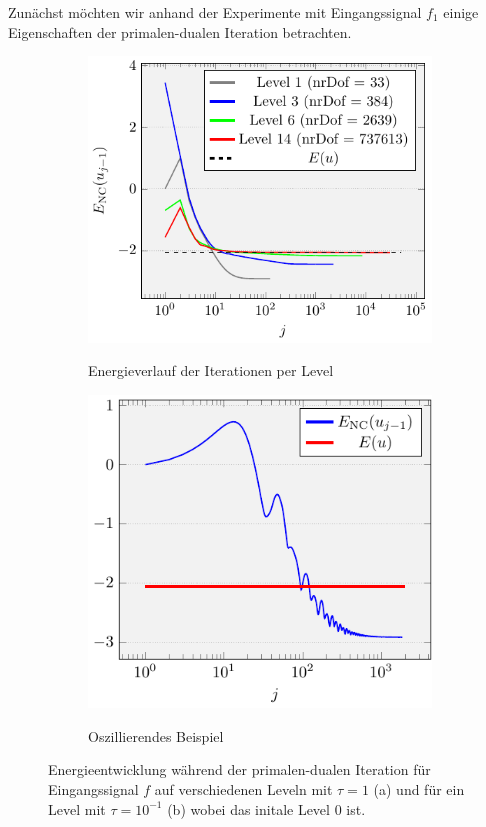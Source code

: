 Zunächst möchten wir anhand der Experimente mit Eingangssignal $f_1$ einige
Eigenschaften der primalen-dualen Iteration betrachten.
\begin{figure}[p]
  \centering
  \begin{subfigure}[b]{.5\linewidth}
    \centering
    \caption{Energieverlauf der Iterationen per Level}
    \includegraphics[width=\linewidth]
      {pictures/chapExperiments/secExactSol/iteration/lvlWise/convEnergy.pdf}
    \label{fig:iterationEnergyLevel}
  \end{subfigure}
  \quad
  \begin{subfigure}[b]{.46\linewidth}
    \centering
    \caption{Oszillierendes Beispiel}
    \includegraphics[width=\linewidth]
      {pictures/chapExperiments/secExactSol/iteration/osc/convEnergy.pdf}
    \label{fig:iterationEnergyOscillations}
  \end{subfigure}
  \caption{Energieentwicklung während der primalen-dualen Iteration für
  Eingangssignal $f$ auf verschiedenen Leveln mit $\tau=1$ (a) und für ein
  Level mit $\tau=10^{-1}$ (b) wobei das initale Level 0 ist.}
  \label{fig:iterationEnergy}
\end{figure}
